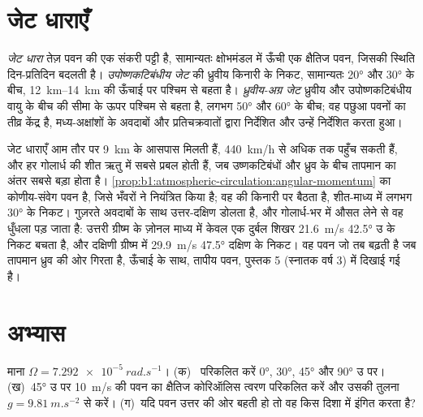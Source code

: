 \section{जेट धाराएँ}\label{sec:b1:atmospheric-circulation:jets}

\begin{definition}[जेट धारा; उपोष्णकटिबंधीय और ध्रुवीय-अग्र जेट]\label{def:b1:atmospheric-circulation:jet}
\emph{जेट धारा} तेज़ पवन की एक संकरी पट्टी है, सामान्यतः क्षोभमंडल में ऊँची एक क्षैतिज पवन, जिसकी स्थिति दिन-प्रतिदिन बदलती है। \emph{उपोष्णकटिबंधीय जेट}  की ध्रुवीय किनारी के निकट, सामान्यतः \ang{20} और \ang{30}  के बीच, \qtyrange{12}{14}{km} की ऊँचाई पर पश्चिम से बहता है। \emph{ध्रुवीय-अग्र जेट} ध्रुवीय और उपोष्णकटिबंधीय वायु के बीच की सीमा के ऊपर पश्चिम से बहता है, लगभग \ang{50} और \ang{60} के बीच; वह पछुआ पवनों का तीव्र केंद्र है, मध्य-अक्षांशों के अवदाबों और प्रतिचक्रवातों द्वारा निर्देशित और उन्हें निर्देशित करता हुआ।
\end{definition}

जेट धाराएँ आम तौर पर \qty{9}{km} के आसपास मिलती हैं, \qty{440}{km/h} से अधिक तक पहुँच सकती हैं, और हर गोलार्ध की शीत ऋतु में सबसे प्रबल होती हैं, जब उष्णकटिबंधों और ध्रुव के बीच तापमान का अंतर सबसे बड़ा होता है।  \cref{prop:b1:atmospheric-circulation:angular-momentum} का कोणीय-संवेग पवन है, जिसे भँवरों ने नियंत्रित किया है; वह  की किनारी पर बैठता है, शीत-माध्य में लगभग \ang{30} के निकट।  गुज़रते अवदाबों के साथ उत्तर-दक्षिण डोलता है, और गोलार्ध-भर में औसत लेने से वह धुँधला पड़ जाता है: उत्तरी ग्रीष्म के ज़ोनल माध्य में केवल एक दुर्बल शिखर \qty{21.6}{m/s} \ang{42.5} उ के निकट बचता है, और दक्षिणी ग्रीष्म में \qty{29.9}{m/s} \ang{47.5} दक्षिण के निकट। वह पवन जो तब बढ़ती है जब तापमान ध्रुव की ओर गिरता है, ऊँचाई के साथ, तापीय पवन, पुस्तक 5 (स्नातक वर्ष 3) में दिखाई गई है।

\section{अभ्यास}

\begin{exercise}[$\star$]\label{exo:b1:atmospheric-circulation:1}
माना $\Omega = \qty{7.292e-5}{rad.s^{-1}}$। (क)~ परिकलित करें
\ang{0}, \ang{30}, \ang{45} और \ang{90} उ पर। (ख)~\ang{45} उ पर \qty{10}{m/s} की पवन का क्षैतिज कोरिऑलिस त्वरण परिकलित करें और उसकी तुलना $g =
\qty{9.81}{m.s^{-2}}$ से करें। (ग)~यदि पवन उत्तर की ओर बहती हो तो वह किस दिशा में इंगित करता है?
\end{exercise}

